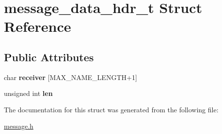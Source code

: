 \hypertarget{structmessage__data__hdr__t}{}\section{message\+\_\+data\+\_\+hdr\+\_\+t Struct Reference}
\label{structmessage__data__hdr__t}
\subsection*{Public Attributes}
\begin{DoxyCompactItemize}
\item 
\mbox{\label{structmessage__data__hdr__t_af6c7df81f506cf337ac5e7948fc3a665}} 
char {\bfseries receiver} \mbox{[}M\+A\+X\+\_\+\+N\+A\+M\+E\+\_\+\+L\+E\+N\+G\+TH+1\mbox{]}
\item 
\mbox{\label{structmessage__data__hdr__t_a4b5503aa5aa13262ce9a702f61176579}} 
unsigned int {\bfseries len}
\end{DoxyCompactItemize}


The documentation for this struct was generated from the following file\+:\begin{DoxyCompactItemize}
\item 
\hyperlink{message_8h}{message.\+h}\end{DoxyCompactItemize}
